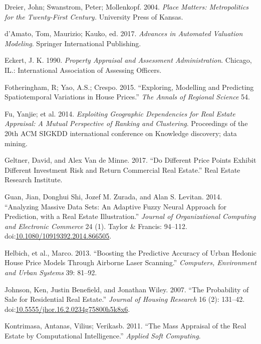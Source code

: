 \documentclass[]{article}
\begin{document}
\hypertarget{ref-Dreier2004}{}
Dreier, John; Swanstrom, Peter; Mollenkopf. 2004. \emph{Place Matters:
Metropolitics for the Twenty-First Century.} University Press of Kansas.

\hypertarget{ref-Springer2017}{}
d'Amato, Tom, Maurizio; Kauko, ed. 2017. \emph{Advances in Automated
Valuation Modeling}. Springer International Publishing.

\hypertarget{ref-Eckert1990}{}
Eckert, J. K. 1990. \emph{Property Appraisal and Assessment
Administration}. Chicago, IL.: International Association of Assessing
Officers.

\hypertarget{ref-Fotheringham2015}{}
Fotheringham, R; Yao, A.S.; Crespo. 2015. ``Exploring, Modelling and
Predicting Spatiotemporal Variations in House Prices.'' \emph{The Annals
of Regional Science} 54.

\hypertarget{ref-Fu2014}{}
Fu, Yanjie; et al. 2014. \emph{Exploiting Geographic Dependencies for
Real Estate Appraisal: A Mutual Perspective of Ranking and Clustering}.
Proceedings of the 20th ACM SIGKDD international conference on Knowledge
discovery; data mining.

\hypertarget{ref-Geltner2017}{}
Geltner, David, and Alex Van de Minne. 2017. ``Do Different Price Points
Exhibit Different Investment Risk and Return Commercial Real Estate.''
Real Estate Research Institute.

\hypertarget{ref-Guan2014}{}
Guan, Jian, Donghui Shi, Jozef M. Zurada, and Alan S. Levitan. 2014.
``Analyzing Massive Data Sets: An Adaptive Fuzzy Neural Approach for
Prediction, with a Real Estate Illustration.'' \emph{Journal of
Organizational Computing and Electronic Commerce} 24 (1). Taylor \&
Francis: 94--112.
doi:\href{https://doi.org/10.1080/10919392.2014.866505}{10.1080/10919392.2014.866505}.

\hypertarget{ref-Helbich2013}{}
Helbich, et al., Marco. 2013. ``Boosting the Predictive Accuracy of
Urban Hedonic House Price Models Through Airborne Laser Scanning.''
\emph{Computers, Environment and Urban Systems} 39: 81--92.

\hypertarget{ref-Johnson2007}{}
Johnson, Ken, Justin Benefield, and Jonathan Wiley. 2007. ``The
Probability of Sale for Residential Real Estate.'' \emph{Journal of
Housing Research} 16 (2): 131--42.
doi:\href{https://doi.org/10.5555/jhor.16.2.0234g75800h5k8x6}{10.5555/jhor.16.2.0234g75800h5k8x6}.

\hypertarget{ref-Kontrimasa2011}{}
Kontrimasa, Antanas, Vilius; Verikasb. 2011. ``The Mass Appraisal of the
Real Estate by Computational Intelligence.'' \emph{Applied Soft
Computing}.
\end{document}
